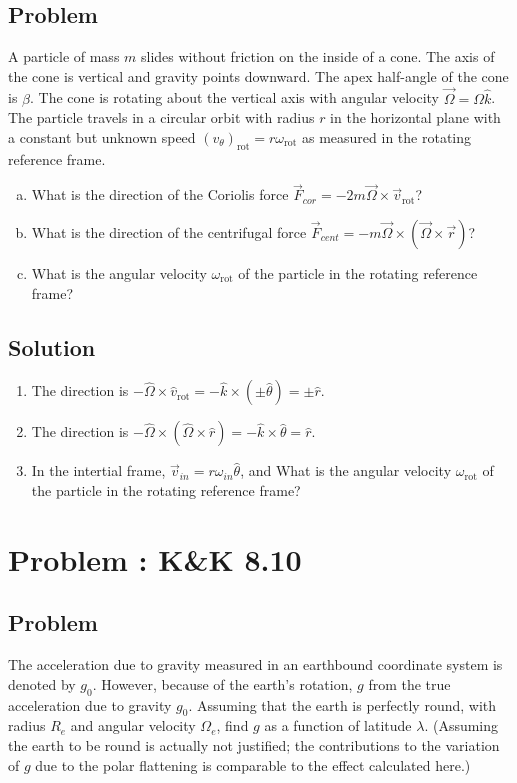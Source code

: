 \documentclass[solutions]{esg8012pset}
\begin{document}
\subsection{Problem}
  A particle of mass $m$ slides without friction on the inside of a cone. The axis of the cone is vertical and gravity points downward. The apex half-angle of the cone is $\beta$. The cone is rotating about the vertical axis with angular velocity $\vec \Omega = \Omega \hat k$.  The particle travels in a circular orbit with radius $r$ in the horizontal plane with a constant but unknown speed $(v_\theta)_\text{rot} = r\omega_\text{rot}$ as measured in the rotating reference frame.
  \begin{enumerate}[(a)]
    \item What is the direction of the Coriolis force $\vec F_{cor} = -2 m \vec \Omega \times \vec v_\text{rot}$?
    \item What is the direction of the centrifugal force $\vec F_{cent} = -m \vec \Omega \times (\vec \Omega \times \vec r)$?
    \item What is the angular velocity $\omega_\text{rot}$ of the particle in the rotating reference frame?
  \end{enumerate}
\subsection{Solution}
\begin{enumerate}
  \item The direction is $-\hat \Omega \times \hat v_\text{rot} = -\hat k \times (\pm \hat\theta) = \pm \hat r$.
  \item The direction is $-\hat \Omega \times(\hat\Omega\times\hat r) = -\hat k \times\hat \theta = \hat r$.
  \item In the intertial frame, $\vec v_{in} = r\omega_{in}\hat\theta$, and  What is the angular velocity $\omega_\text{rot}$ of the particle in the rotating reference frame?
\end{enumerate}
\section{Problem \thesection: K\&K 8.10}
\subsection{Problem}
  The acceleration due to gravity measured in an earthbound coordinate system is denoted by $g_0$. However, because of the earth's rotation, $g$ from the true acceleration due to gravity $g_0$. Assuming that the earth is perfectly round, with radius $R_e$ and angular velocity $\Omega_e$, find $g$ as a function of latitude $\lambda$. (Assuming the earth to be round is actually not justified; the contributions to the variation of $g$ due to the polar flattening is comparable to the effect calculated here.)
\end{document}

